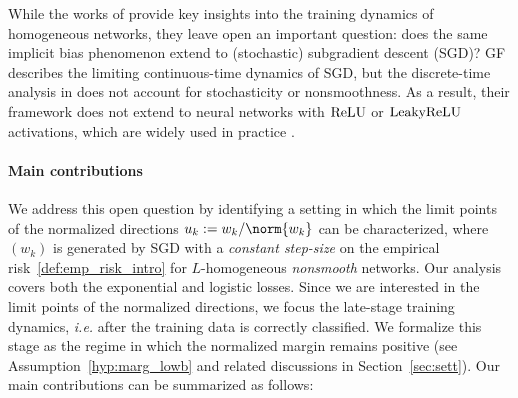 While the works of \cite{Lyu_Li_maxmargin,ji2020directional} provide key insights into the training dynamics of homogeneous networks, they leave open an important question: does the same implicit bias phenomenon extend to (stochastic) subgradient descent (SGD)? GF describes the limiting continuous-time dynamics of SGD, but the discrete-time analysis in \cite{Lyu_Li_maxmargin} does not account for stochasticity or nonsmoothness. As a result, their framework does not extend to neural networks with $\operatorname{ReLU}$ or $\operatorname{LeakyReLU}$ activations, which are widely used in practice \citep{goodfellow2016deep,fleuret2023little}.

\paragraph{Main contributions} We address this open question by identifying a setting in which the limit points of the normalized directions $u_k := w_k / \norm{w_k}$ can be characterized, where $(w_k)$ is generated by SGD with a \emph{constant step-size} on the empirical risk~\eqref{def:emp_risk_intro} for $L$-homogeneous \emph{nonsmooth} networks. Our analysis covers both the exponential and logistic losses. Since we are interested in the limit points of the normalized directions, we focus the late-stage training dynamics, \textit{i.e.} after the training data is correctly classified. We formalize this stage as the regime in which the normalized margin remains positive (see Assumption~\ref{hyp:marg_lowb} and related discussions in Section~\ref{sec:sett}). Our main contributions can be summarized as follows:

